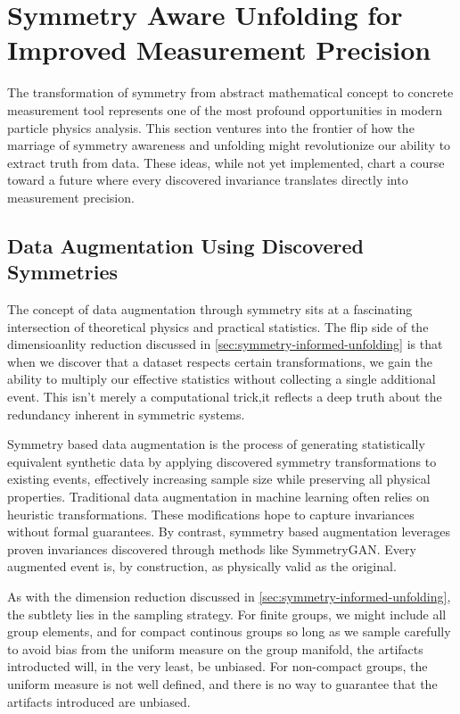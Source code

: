 \section{Symmetry Aware Unfolding for Improved Measurement Precision}
    The transformation of symmetry from abstract mathematical concept to concrete measurement tool represents one of the most profound opportunities in modern particle physics analysis.
    This section ventures into the frontier of how the marriage of symmetry awareness and unfolding might revolutionize our ability to extract truth from data.
    These ideas, while not yet implemented, chart a course toward a future where every discovered invariance translates directly into measurement precision.
    \subsection{Data Augmentation Using Discovered Symmetries}
        The concept of data augmentation through symmetry sits at a fascinating intersection of theoretical physics and practical statistics.
        The flip side of the dimensioanlity reduction discussed in \cref{sec:symmetry-informed-unfolding} is that when we discover that a dataset respects certain transformations, we gain the ability to multiply our effective statistics without collecting a single additional event.
        This isn't merely a computational trick,it reflects a deep truth about the redundancy inherent in symmetric systems.

        Symmetry based data augmentation is the process of generating statistically equivalent synthetic data by applying discovered symmetry transformations to existing events, effectively increasing sample size while preserving all physical properties.
        Traditional data augmentation in machine learning often relies on heuristic transformations.
        These modifications hope to capture invariances without formal guarantees.
        By contrast, symmetry based augmentation leverages proven invariances discovered through methods like SymmetryGAN.
        Every augmented event is, by construction, as physically valid as the original.

        As with the dimension reduction discussed in \cref{sec:symmetry-informed-unfolding}, the subtlety lies in the sampling strategy.
        For finite groups, we might include all group elements, and for compact continous groups so long as we sample carefully to avoid bias from the uniform measure on the group manifold, the artifacts introducted will, in the very least, be unbiased.
        For non-compact groups, the uniform measure is not well defined, and there is no way to guarantee that the artifacts introduced are unbiased.


